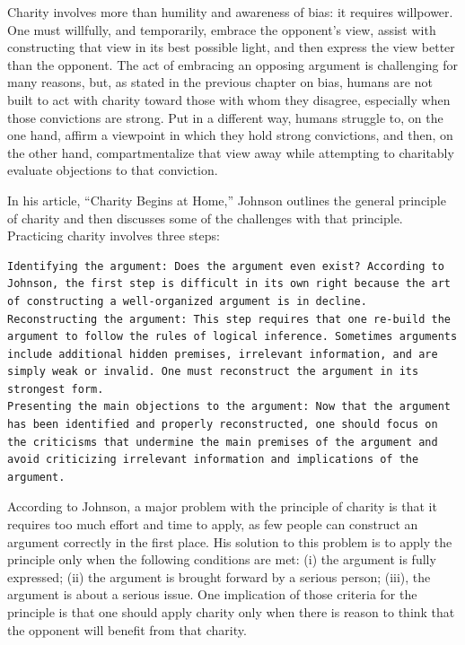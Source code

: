 \documentclass[
]{book}
\begin{document}
Charity involves more than humility and awareness of bias: it requires willpower. One must willfully, and temporarily, embrace the opponent's view, assist with constructing that view in its best possible light, and then express the view better than the opponent. The act of embracing an opposing argument is challenging for many reasons, but, as stated in the previous chapter on bias, humans are not built to act with charity toward those with whom they disagree, especially when those convictions are strong. Put in a different way, humans struggle to, on the one hand, affirm a viewpoint in which they hold strong convictions, and then, on the other hand, compartmentalize that view away while attempting to charitably evaluate objections to that conviction.

In his article, ``Charity Begins at Home,'' Johnson outlines the general principle of charity and then discusses some of the challenges with that principle. Practicing charity involves three steps:

\begin{verbatim}
Identifying the argument: Does the argument even exist? According to Johnson, the first step is difficult in its own right because the art of constructing a well-organized argument is in decline.
Reconstructing the argument: This step requires that one re-build the argument to follow the rules of logical inference. Sometimes arguments include additional hidden premises, irrelevant information, and are simply weak or invalid. One must reconstruct the argument in its strongest form.
Presenting the main objections to the argument: Now that the argument has been identified and properly reconstructed, one should focus on the criticisms that undermine the main premises of the argument and avoid criticizing irrelevant information and implications of the argument.
\end{verbatim}

According to Johnson, a major problem with the principle of charity is that it requires too much effort and time to apply, as few people can construct an argument correctly in the first place. His solution to this problem is to apply the principle only when the following conditions are met: (i) the argument is fully expressed; (ii) the argument is brought forward by a serious person; (iii), the argument is about a serious issue. One implication of those criteria for the principle is that one should apply charity only when there is reason to think that the opponent will benefit from that charity.
\end{document}
